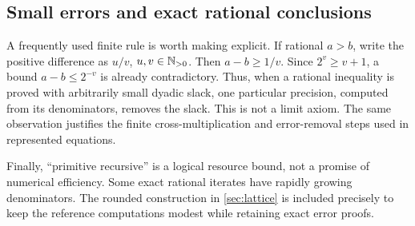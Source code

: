 \subsection{Small errors and exact rational conclusions}

A frequently used finite rule is worth making explicit. If rational
\(a>b\), write the positive difference as \(u/v\), \(u,v\in\mathbb N_{>0}\).
Then \(a-b\ge1/v\). Since \(2^v\ge v+1\), a bound
\(a-b\le2^{-v}\) is already contradictory. Thus, when a rational
inequality is proved with arbitrarily small dyadic slack, one particular
precision, computed from its denominators, removes the slack. This is
not a limit axiom. The same observation justifies the finite
cross-multiplication and error-removal steps used in represented
equations.

Finally, ``primitive recursive'' is a logical resource bound, not a
promise of numerical efficiency. Some exact rational iterates have
rapidly growing denominators. The rounded construction in
\cref{sec:lattice} is included precisely to keep the reference
computations modest while retaining exact error proofs.

